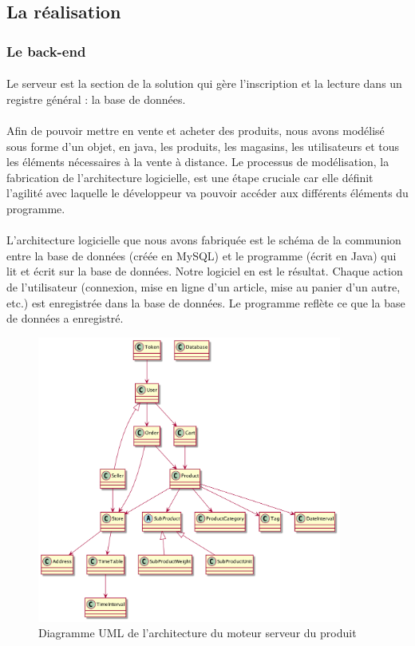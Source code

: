 \documentclass[a4paper, 12pt]{article}
\begin{document}
\subsection{La réalisation}
\subsubsection{Le back-end}

\paragraph{}Le serveur est la section de la solution qui gère l’inscription et la lecture dans un registre général : la base de données.
\paragraph{}Afin de pouvoir mettre en vente et acheter des produits, nous avons modélisé sous forme d’un objet, en java, les produits, les magasins, les utilisateurs et tous les éléments nécessaires à la vente à distance. Le processus de modélisation, la fabrication de l'architecture logicielle, est une étape cruciale car elle définit l’agilité avec laquelle le développeur va pouvoir accéder aux différents éléments du programme.
\paragraph{}L’architecture logicielle que nous avons fabriquée est le schéma de la communion entre la base de données (créée en MySQL) et le programme (écrit en Java) qui lit et écrit sur la base de données. Notre logiciel en est le résultat. Chaque action de l’utilisateur (connexion, mise en ligne d’un article, mise au panier d’un autre, etc.) est enregistrée dans la base de données. Le programme reflète ce que la base de données a enregistré.

\begin{figure}[H]
	\begin{center}
		\includegraphics[width=10cm]{fig/uml-simplified.png}
		\caption{Diagramme UML de l'architecture du moteur serveur du produit}
	\end{center}
\end{figure}
\end{document}
